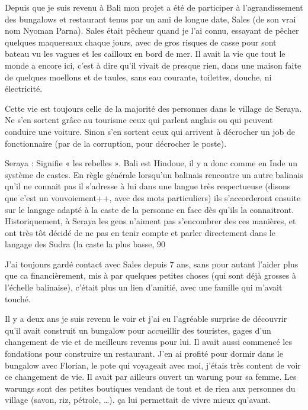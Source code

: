 \par
Depuis que je suis revenu à Bali mon projet a été de participer à l’agrandissement des bungalows et restaurant tenus par un ami de longue date, Sales (de son vrai nom Nyoman Parna). Sales était pêcheur quand je l’ai connu, essayant de pêcher quelques maquereaux chaque jours, avec de gros risques de casse pour sont bateau vu les vagues et les cailloux en bord de mer. Il avait la vie que tout le monde a encore ici, c’est à dire qu’il vivait de presque rien, dans une maison faite de quelques moellons et de taules, sans eau courante, toilettes, douche, ni électricité.

\par
Cette vie est toujours celle de la majorité des personnes dans le village de Seraya. Ne s’en sortent grâce au tourisme ceux qui parlent anglais ou qui peuvent conduire une voiture. Sinon s’en sortent ceux qui arrivent à décrocher un job de fonctionnaire (par de la corruption, pour décrocher le poste).

\par
Seraya : Signifie « les rebelles ». Bali est Hindoue, il y a donc comme en Inde un système de castes. En règle générale lorsqu’un balinais rencontre un autre balinais qu’il ne connait pas il s’adresse à lui dans une langue très respectueuse (disons que c’est un vouvoiement++, avec des mots particuliers) ils s’accorderont ensuite sur le langage adapté à la caste de la personne en face dès qu’ils la connaitront. Historiquement, à Seraya les gens n’aiment pas s’encombrer des ces manières, et ont très tôt décidé de ne pas en tenir compte et parler directement dans le langage des Sudra (la caste la plus basse, 90%

\par
J’ai toujours gardé contact avec Sales depuis 7 ans, sans pour autant l’aider plus que ca financièrement, mis à par quelques petites choses (qui sont déjà grosses à l’échelle balinaise), c’était plus un lien d’amitié, avec une famille qui m’avait touché.

\par
Il y a deux ans je suis revenu le voir et j’ai eu l’agréable surprise de découvrir qu’il avait construit un bungalow pour accueillir des touristes, gages d’un changement de vie et de meilleurs revenus pour lui. Il avait aussi commencé les fondations pour construire un restaurant. J’en ai profité pour dormir dans le bungalow avec Florian, le pote qui voyageait avec moi, j’étais très content de voir ce changement de vie. Il avait par ailleurs ouvert un warung pour sa femme. Les warungs sont des petites boutiques vendant de tout et de rien aux personnes du village (savon, riz, pétrole, …). ça lui permettait de vivre mieux qu’avant.

